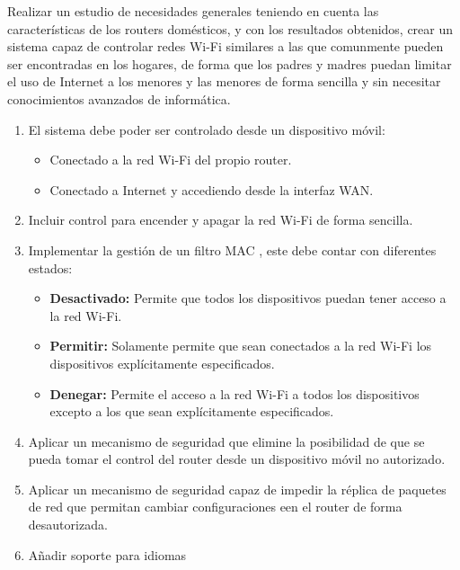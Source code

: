\documentclass[12pt]{article}
\begin{document}
    Realizar un estudio de necesidades generales teniendo en cuenta las características de los routers domésticos, y con los resultados obtenidos, crear un sistema capaz de controlar redes Wi-Fi similares a las que comunmente pueden ser encontradas en los hogares, de forma que los padres y madres puedan limitar el uso de Internet a los menores y las menores de forma sencilla y sin necesitar conocimientos avanzados de informática.
    \begin{enumerate}
        \item El sistema debe poder ser controlado desde un dispositivo móvil:
        \begin{itemize}
            \item Conectado a la red Wi-Fi del propio router.
            \item Conectado a Internet y accediendo desde la interfaz WAN.
        \end{itemize}

        \item Incluir control para encender y apagar la red Wi-Fi de forma sencilla.
        \item Implementar la gestión de un filtro MAC , este debe contar con diferentes estados:
            \begin{itemize}
                \item \textbf{Desactivado:} Permite que todos los dispositivos puedan tener acceso a la red Wi-Fi.
                \item \textbf{Permitir:} Solamente permite que sean conectados a la red Wi-Fi los dispositivos explícitamente especificados. 
                \item \textbf{Denegar:} Permite el acceso a la red Wi-Fi a todos los dispositivos excepto a los que sean explícitamente especificados.
            \end{itemize}
        \item Aplicar un mecanismo de seguridad que elimine la posibilidad de que se pueda tomar el control del router desde un dispositivo móvil no autorizado.
        \item Aplicar un mecanismo de seguridad capaz de impedir la réplica de paquetes de red que permitan cambiar configuraciones een el router de forma desautorizada.
        \item Añadir soporte para idiomas
    \end{enumerate}
\end{document}
